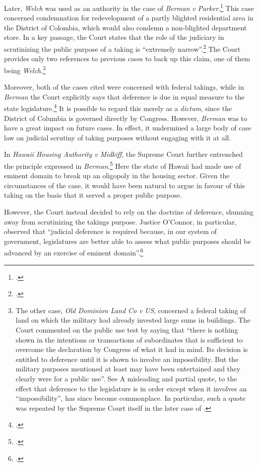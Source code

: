 Later, {\it Welch} was used as an authority in the case of {\it Berman v Parker}.\footcite{berman54} This case concerned condemnation for redevelopment of a partly blighted residential area in the District of Colombia, which would also condemn a non-blighted department store. In a key passage, the Court states that the role of the judiciary in scrutinizing the public purpose of a taking is ``extremely narrow''.\footcite[32]{berman54} The Court provides only two references to previous cases to back up this claim, one of them being {\it Welch}.\footnote{The other case, {\it Old Dominion Land Co v US}, concerned a federal taking of land on which the military had already invested large sums in buildings. The Court commented on the public use test by saying that ``there is nothing shown in the intentions or transactions of subordinates that is sufficient to overcome the declaration by Congress of what it had in mind. Its decision is entitled to deference until it is shown to involve an impossibility. But the military purposes mentioned at least may have been entertained and they clearly were for a public use''. See \cite[66]{dominion25} A misleading and partial quote, to the effect that deference to the legislature is in order except when it involves an ``impossibility'', has since become commonplace. In particular, such a quote was repeated by the Supreme Court itself in the later case of \cite[240]{midkiff84}.}

Moreover, both of the cases cited were concerned with federal takings, while in {\it Berman} the Court explicitly says that deference is due in equal measure to the state legislature.\footcite[32]{berman54} It is possible to regard this merely as a {\it dictum}, since the District of Columbia is governed directly by Congress. However, {\it Berman} was to have a great impact on future cases. In effect, it undermined a large body of case law on judicial scrutiny of taking purposes without engaging with it at all.

In {\it Hawaii Housing Authority v Midkiff}, the Supreme Court further entrenched the principle expressed in {\it Berman}.\footcite{midkiff84} Here the state of Hawaii had made use of eminent domain  to break up an oligopoly in the housing sector. Given the circumstances of the case, it would have been natural to argue in favour of this taking on the basis that it served a proper public purpose.

However, the Court instead decided to rely on the doctrine of deference, shunning away from scrutinizing the takings purpose. Justice O'Connor, in particular, observed that ``judicial deference is required because, in our system of government, legislatures are better able to assess what public purposes should be advanced by an exercise of eminent domain''.\footcite[244]{hawaii84}

